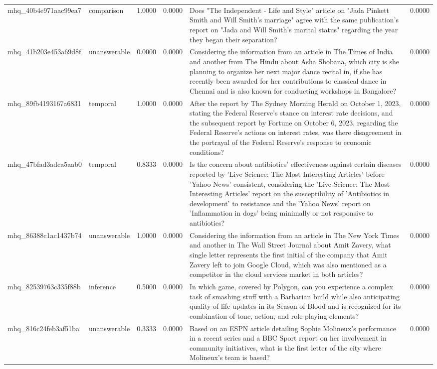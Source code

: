 \begin{tabular}{llrrlr}
mhq_40b4e971aac99ea7 & comparison & 1.0000 & 0.0000 & Does "The Independent - Life and Style" article on "Jada Pinkett Smith and Will Smith's marriage" agree with the same publication's report on "Jada and Will Smith's marital status" regarding the year they began their separation? & 0.0000 \\
mhq_41b203e453a69d8f & unanswerable & 0.0000 & 0.0000 & Considering the information from an article in The Times of India and another from The Hindu about Asha Shobana, which city is she planning to organize her next major dance recital in, if she has recently been awarded for her contributions to classical dance in Chennai and is also known for conducting workshops in Bangalore? & 0.0000 \\
mhq_89fb4193167a6831 & temporal & 1.0000 & 0.0000 & After the report by The Sydney Morning Herald on October 1, 2023, stating the Federal Reserve's stance on interest rate decisions, and the subsequent report by Fortune on October 6, 2023, regarding the Federal Reserve's actions on interest rates, was there disagreement in the portrayal of the Federal Reserve's response to economic conditions? & 0.0000 \\
mhq_47bfad3adca5aab0 & temporal & 0.8333 & 0.0000 & Is the concern about antibiotics' effectiveness against certain diseases reported by 'Live Science: The Most Interesting Articles' before 'Yahoo News' consistent, considering the 'Live Science: The Most Interesting Articles' report on the susceptibility of 'Antibiotics in development' to resistance and the 'Yahoo News' report on 'Inflammation in dogs' being minimally or not responsive to antibiotics? & 0.0000 \\
mhq_86388c1ac1437b74 & unanswerable & 1.0000 & 0.0000 & Considering the information from an article in The New York Times and another in The Wall Street Journal about Amit Zavery, what single letter represents the first initial of the company that Amit Zavery left to join Google Cloud, which was also mentioned as a competitor in the cloud services market in both articles? & 0.0000 \\
mhq_82539763c335f88b & inference & 0.5000 & 0.0000 & In which game, covered by Polygon, can you experience a complex task of smashing stuff with a Barbarian build while also anticipating quality-of-life updates in its Season of Blood and is recognized for its combination of tone, action, and role-playing elements? & 0.0000 \\
mhq_816c24feb3af51ba & unanswerable & 0.3333 & 0.0000 & Based on an ESPN article detailing Sophie Molineux's performance in a recent series and a BBC Sport report on her involvement in community initiatives, what is the first letter of the city where Molineux's team is based? & 0.0000 \\

\end{tabular}
